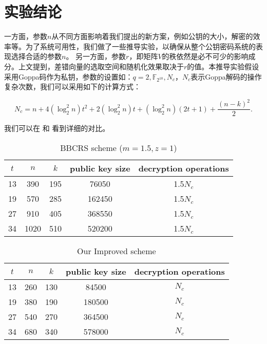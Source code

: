 \section{实验结论}
一方面，参数$n$从不同方面影响着我们提出的新方案，例如公钥的大小，解密的效率等。为了系统可用性，我们做了一些推导实验，以确保从整个公钥密码系统的表现选择合适的参数$n$。 另一方面，参数$r$，即矩阵$V$的秩依然是必不可少的影响成分。上文提到，差错向量的选取空间和随机化效果取决于$r$的值。本推导实验假设采用Goppa码作为私钥，参数的设置如：$q = 2, \mathbb{F}_{2^{10}}, N_c$，$N_c$表示Goppa解码的操作复杂次数，我们可以采用如下的计算方式：

\begin{equation}
	N_c=n+4(\log_2^2n)t^2+2(\log_2^2n)t+(\log_2^2n)(2t+1)+\frac{(n-k)^2}{2}.
\end{equation}

我们可以在 和 看到详细的对比。

\begin{table}[h]
	\begin{center}
		\caption{BBCRS scheme ($m=1.5,z=1$)}\label{bbcrsScheme}
		\begin{tabular}{ccccc}
			\hline
			$t$ & $n$& $k$ & public key size& decryption operations\\
			\hline
			13& 390& 195& 76050& 1.5$N_c$\\
			19& 570& 285& 162450& 1.5$N_c$\\
			27& 910& 405& 368550& 1.5$N_c$\\
			34& 1020& 510& 520200& 1.5$N_c$\\
			\hline
		\end{tabular}
	\end{center}
\end{table}

\begin{table}[h]
	\begin{center}
		\caption{Our Improved scheme}\label{ourScheme}
		\begin{tabular}{ccccc}
			\hline
			$t$ & $n$& $k$ & public key size& decryption operations\\
			\hline
			13& 260& 130& 84500& $N_c$\\
			19& 380& 190& 180500& $N_c$\\
			27& 540& 270& 364500& $N_c$\\
			34& 680& 340& 578000& $N_c$\\
			\hline
		\end{tabular}
	\end{center}
\end{table}

